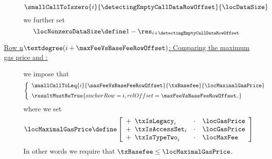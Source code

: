 \begin{description}
		\[
			\smallCallToIszero
			{i}{\detectingEmptyCallDataRowOffset}
			{\locDataSize}
		\]
		we further set
		\[
			\locNonzeroDataSize \define 1 - \res_{i + \detectingEmptyCallDataRowOffset}
		\]
        \item[\underline{\underline{Row n$°(i + \maxFeeVsBaseFeeRowOffset)$: Comparing the maximum gas price and \txBasefee{}:}}]
                we impose that
                \[
                        \left\{ \begin{array}{l}
                                \smallCallToLeq
                                {i}{\maxFeeVsBaseFeeRowOffset}
                                {\txBasefee}
				{\locMaximalGasPrice}
                                \vspace{2mm}
                                \\
                                \resultMustBeTrue {
                                        anchorRow = i                         ,
                                        relOffset = \maxFeeVsBaseFeeRowOffset ,
                                }
                                \\
                        \end{array} \right.
                \]
		where we set
		\[
			\locMaximalGasPrice \define
			\left[ \begin{array}{clcl}
				+ \!\!\! & \txIsLegacy    _{i} & \cdot & \locGasPrice \\
				+ \!\!\! & \txIsAccessSet _{i} & \cdot & \locGasPrice \\
				+ \!\!\! & \txIsTypeTwo   _{i} & \cdot & \locMaxFee   \\
			\end{array} \right]
		\]
		\saNote{}
		In other words we require that
                $\txBasefee \leq \locMaximalGasPrice$.
\end{description}
